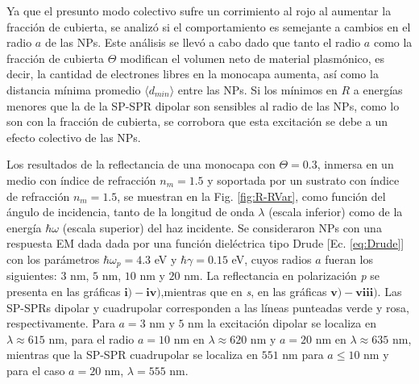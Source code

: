 
 Ya que el presunto modo colectivo sufre un corrimiento al rojo al aumentar la fracción de cubierta, se analizó si el comportamiento es semejante a cambios en el radio $a$ de las NPs.  Este análisis se llevó a cabo dado que tanto el radio $a$ como la fracción de cubierta $\Theta$ modifican el volumen neto de material plasmónico, es decir, la cantidad de electrones libres en la monocapa aumenta, así como la distancia mínima promedio $\langle d_{min}  \rangle$ entre las NPs. Si  los mínimos en $R$  a energías menores que la de la SP-SPR dipolar son sensibles al radio de las NPs, como lo son con la fracción de cubierta, se corrobora que esta excitación se debe a un efecto colectivo de las NPs.
 
Los resultados de la reflectancia de una monocapa con $\Theta=0.3$, inmersa en un medio con índice de refracción $n_m = 1.5$ y soportada por un sustrato con índice de refracción $n_m= 1.5$, se muestran en la Fig.  \ref{fig:R-RVar}, como función del ángulo de incidencia, tanto de la longitud de onda $\lambda$ (escala inferior) como de la  energía $\hbar\omega$ (escala superior) del haz incidente. Se consideraron NPs  con una respuesta EM dada dada por una función dieléctrica  tipo Drude [Ec. \eqref{eq:Drude}] con los parámetros $\hbar\omega_p =4.3$ eV y $\hbar\gamma=0.15$ eV, cuyos radios $a$ fueran los siguientes: $3$ nm, $5$ nm, $10$ nm y $20$ nm. La reflectancia en polarización \emph{p} se presenta en las gráficas $\mathbf{i)-iv)}$,mientras que en \emph{s}, en las gráficas $\mathbf{v)-viii)}$. Las SP-SPRs dipolar y cuadrupolar corresponden a las líneas punteadas verde y rosa, respectivamente. Para $a = 3$ nm y $5$ nm la excitación dipolar se localiza en $\lambda\approx 615$ nm, para el radio  $a = 10$ nm en $\lambda\approx 620$ nm y $a=20$ nm en $\lambda\approx 635$ nm, mientras que la SP-SPR cuadrupolar se localiza en $551$ nm para $a\leq 10$ nm y para el caso  $a=20$ nm, $\lambda = 555$ nm.

